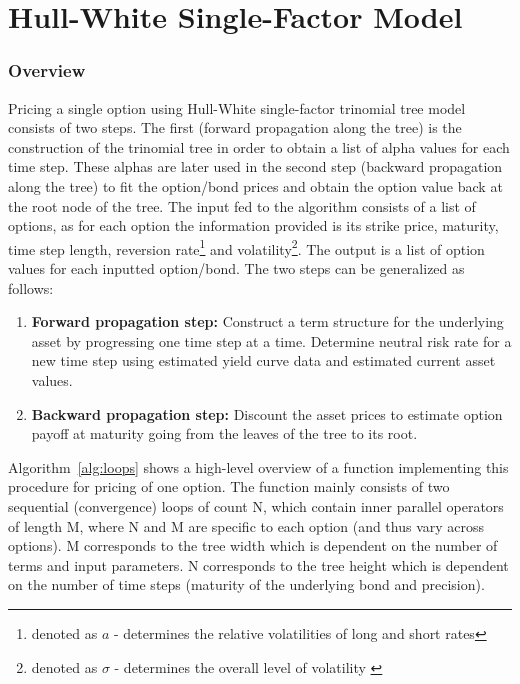 \chapter{Hull-White Single-Factor Model}
\label{chapter:hullwhitemodel}

\subsection{Overview}
Pricing a single option using Hull-White single-factor trinomial tree model consists of two steps. The first (forward propagation along the tree) is the construction of the trinomial tree in order to obtain a list of alpha values for each time step. These alphas are later used in the second step (backward propagation along the tree) to fit the option/bond prices and obtain the option value back at the root node of the tree. The input fed to the algorithm consists of a list of options, as for each option the information provided is its strike price, maturity, time step length, reversion rate\footnote{denoted as $a$ - determines the relative volatilities of long and short rates\cite[pg.9]{npfits}} and volatility\footnote{denoted as $\sigma$ - determines the overall level of volatility \cite[pg. 9]{npfits}}. The output is a list of option values for each inputted option/bond. The two steps can be generalized as follows: 

\begin{enumerate}
    \item \textbf{Forward propagation step:} Construct a term structure for the underlying asset by progressing one time step at a time. Determine neutral risk rate for a new time step using estimated yield curve data and estimated current asset values.
    \item \textbf{Backward propagation step:} Discount the asset prices to estimate option payoff at maturity going from the leaves of the tree to its root. 
\end{enumerate}

Algorithm~\ref{alg:loops} shows a high-level overview of a function implementing this procedure for pricing of one option. The function mainly consists of two sequential (convergence) loops of count N, which contain inner parallel operators of length M, where N and M are specific to each option (and thus vary across options). M corresponds to the tree width which is dependent on the number of terms and input parameters. N corresponds to the tree height which is dependent on the number of time steps (maturity of the underlying bond and precision).

